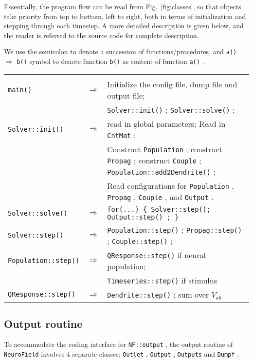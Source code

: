 \documentclass[12pt,a4paper]{article}
\newcommand{\type}[1]{ {\small\small\tt #1} }
\newcommand{\NF}[0]{ \type{NeuroField}}
\begin{document}
Essentially, the program flow can be read from Fig.~\ref{fig:classes}, so that objects take priority from top to bottom, left to right, both in terms of initialization and stepping through each timestep. A more detailed description is given below, and the reader is referred to the source code for complete description.

We use the semicolon to denote a succession of functions/procedures, and \type{a()} $\Rightarrow$ \type{b()} symbol to denote function \type{b()} as content of function \type{a()}.

\begin{center}
\begin{tabular}{ | l l p{11cm} | }
\hline \\

\type{main()}& $\Rightarrow$ &Initialize the config file, dump file and output file;\\[6pt]
&&\type{Solver::init()};\type{Solver::solve()};\\[6pt]
\type{Solver::init()}& $\Rightarrow$ &read in global parameters; Read in \type{CntMat};\\[6pt]
&&Construct \type{Population}; construct \type{Propag}; construct \type{Couple}; \type{Population::add2Dendrite()};\\[6pt]
&&Read configurations for \type{Population}, \type{Propag}, \type{Couple}, and \type{Output}.\\[6pt]
\type{Solver::solve()}& $\Rightarrow$ & \type{for(...) \{ Solver::step(); \type{Output::step()}; \} }\\[6pt]
\type{Solver::step()}& $\Rightarrow$ & \type{Population::step()}; \type{Propag::step()}; \type{Couple::step()};\\[6pt]
\type{Population::step()}& $\Rightarrow$ & \type{QResponse::step()} if neural population;\\[6pt]
&&\type{Timeseries::step()} if stimulus\\[6pt]
\type{QResponse::step()}& $\Rightarrow$ & \type{Dendrite::step()}; sum over \(V_{ab}\)

\\\hline
\end{tabular}
\end{center}

\subsection{Output routine}

To accommodate the coding interface for \type{NF::output}, the output routine of \NF involves 4 separate classes: \type{Outlet}, \type{Output}, \type{Outputs} and \type{Dumpf}.
\end{document}
